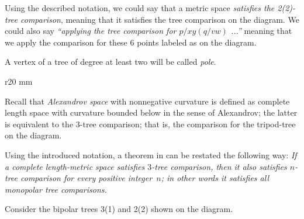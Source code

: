 Using the described notation, we could say that a metric space \emph{satisfies the 2(2)-tree comparison},  meaning that it satisfies the tree comparison on the diagram.
We could also say \emph{``applying the tree comparison for $p/xy(q/vw)$ ...''} meaning that we apply the comparison for these 6 points labeled as on the diagram.

A vertex of a tree of degree at least two will be called \emph{pole}.

\begin{wrapfigure}{r}{20 mm}
\end{wrapfigure}

Recall that \emph{Alexandrov space} with nonnegative curvature is defined as complete length space with curvature bounded below in the sense of Alexandrov;
the latter is equivalent to the 3-tree comparison; that is, the comparison for the tripod-tree on the diagram. 

Using the introduced notation, a theorem in \cite{AKP} can be restated the following way: \emph{If a complete length-metric space satisfies $3$-tree comparison, then it also satisfies $n$-tree comparison for every positive integer~$n$; in other words it satisfies all monopolar tree comparisons.}

Consider the bipolar trees 3(1) and 2(2) shown on the diagram.

